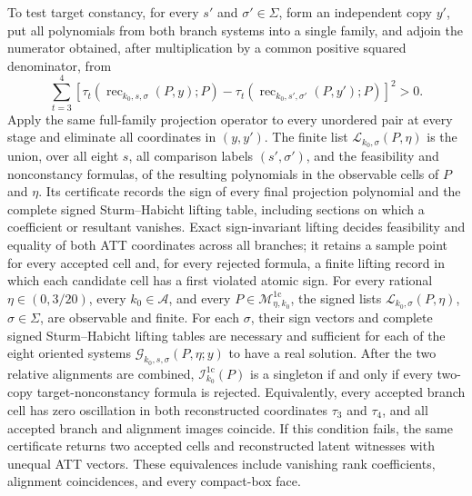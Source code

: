 To test target constancy, for every \(s'\) and \(\sigma'\in\Sigma\), form an independent copy \(y'\), put all polynomials from both branch systems into a single family, and adjoin the numerator obtained, after multiplication by a common positive squared denominator, from
\[
 \sum_{t=3}^{4}\left[
 \tau_t\!\left(\operatorname{rec}_{k_0,s,\sigma}(P,y);P\right)
 -\tau_t\!\left(\operatorname{rec}_{k_0,s',\sigma'}(P,y');P\right)
 \right]^2>0.
\]
Apply the same full-family projection operator to every unordered pair at every stage and eliminate all coordinates in \((y,y')\).  The finite list \(\mathscr L_{k_0,\sigma}(P,\eta)\) is the union, over all eight \(s\), all comparison labels \((s',\sigma')\), and the feasibility and nonconstancy formulas, of the resulting polynomials in the observable cells of \(P\) and \(\eta\).  Its certificate records the sign of every final projection polynomial and the complete signed Sturm--Habicht lifting table, including sections on which a coefficient or resultant vanishes.  Exact sign-invariant lifting decides feasibility and equality of both ATT coordinates across all branches; it retains a sample point for every accepted cell and, for every rejected formula, a finite lifting record in which each candidate cell has a first violated atomic sign.
For every rational \(\eta\in(0,3/20)\), every \(k_0\in\mathcal A\), and every \(P\in\mathcal M_{\eta,k_0}^{1\mathrm c}\), the signed lists \(\mathscr L_{k_0,\sigma}(P,\eta)\), \(\sigma\in\Sigma\), are observable and finite.  For each \(\sigma\), their sign vectors and complete signed Sturm--Habicht lifting tables are necessary and sufficient for each of the eight oriented systems \(\mathscr G_{k_0,s,\sigma}(P,\eta;y)\) to have a real solution.  After the two relative alignments are combined, \(\mathcal I_{k_0}^{1\mathrm c}(P)\) is a singleton if and only if every two-copy target-nonconstancy formula is rejected.  Equivalently, every accepted branch cell has zero oscillation in both reconstructed coordinates \(\tau_3\) and \(\tau_4\), and all accepted branch and alignment images coincide.  If this condition fails, the same certificate returns two accepted cells and reconstructed latent witnesses with unequal ATT vectors.  These equivalences include vanishing rank coefficients, alignment coincidences, and every compact-box face.
